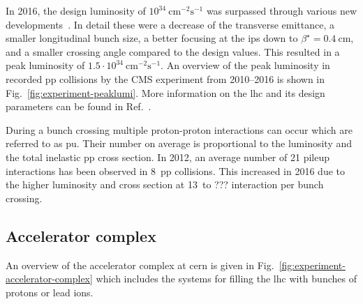 In 2016, the design luminosity of $10^{34}~\mathrm{cm}^{-2}\mathrm{s}^{-1}$ was surpassed through various new developments~\cite{Team:2229040}. In detail these were a decrease of the transverse emittance, a smaller longitudinal bunch size, a better focusing at the \glspl{ip} down to $\beta^\star=0.4~\mathrm{cm}$, and a smaller crossing angle compared to the design values. This resulted in a peak luminosity of $1.5\cdot 10^{34}~\mathrm{cm}^{-2}\mathrm{s}^{-1}$. An overview of the peak luminosity in recorded \gls{pp} collisions by the CMS experiment from 2010--2016 is shown in Fig.~\ref{fig:experiment-peaklumi}. More information on the \gls{lhc} and its design parameters can be found in Ref.~\cite{Evans:2008zzb}.


During a bunch crossing multiple proton-proton interactions can occur which are referred to as \gls{pu}. Their number on average is proportional to the luminosity and the total inelastic \gls{pp} cross section. In 2012, an average number of 21 pileup interactions has been observed in 8~\TeV \gls{pp} collisions. This increased in 2016 due to the higher luminosity and cross section at 13~\TeV to ??? interaction per bunch crossing. 


\subsection{Accelerator complex}

An overview of the accelerator complex at \gls{cern} is given in Fig.~\ref{fig:experiment-accelerator-complex} which includes the systems for filling the \gls{lhc} with bunches of protons or lead ions.

